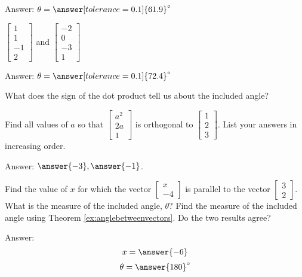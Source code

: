 \documentclass{ximera}
\begin{document}
\begin{problem}
\begin{problem}
   Answer: $\theta=\answer[tolerance=0.1]{61.9}^\circ$
  \end{problem}
 
\begin{problem}\label{prob:anglebetweenvectors4}
  $\begin{bmatrix}1\\1\\-1\\2\end{bmatrix}$ and $\begin{bmatrix}-2\\0\\-3\\1\end{bmatrix}$
   
   Answer: $\theta=\answer[tolerance=0.1]{72.4}^\circ$
  \end{problem}
   
  \end{problem}
 
\begin{problem}\label{prob:dotproductsign}
What does the sign of the dot product tell us about the included angle?
\end{problem}
 
\begin{problem}\label{prob:orthvectorsdot}
Find all values of $a$ so that $\begin{bmatrix}a^2\\2a\\1\end{bmatrix}$ is orthogonal to $\begin{bmatrix}1\\2\\3\end{bmatrix}$.  List your answers in increasing order.
 
Answer: $\answer{-3}, \answer{-1}$.
\end{problem}
 
\begin{problem}\label{prob:parallelvectdot}
Find the value of $x$ for which the vector $\begin{bmatrix}x\\-4\end{bmatrix}$ is parallel to the vector $\begin{bmatrix}3\\2\end{bmatrix}$. What is the measure of the included angle, $\theta$? Find the measure of the included angle using Theorem \ref{ex:anglebetweenvectors}.  Do the two results agree?
 
Answer:
$$x=\answer{-6}$$
$$\theta=\answer{180}^\circ$$
\end{problem}
 
\end{document}
